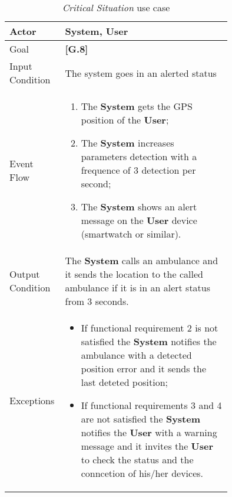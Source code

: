 \begin{center}
\begin{table}
\begin{tabular}{ | l | p{0.75\linewidth} | }
  \hline
    Actor & \textbf{System}, \textbf{User} \\ \hline
    Goal & \textbf{[G.8]} \\ \hline
    Input Condition & The system goes in an alerted status \\ \hline
    Event Flow & \begin{minipage}[t]{0.7\textwidth}
      \begin{enumerate}
        \item The \textbf{System} gets the GPS position of the \textbf{User};
        \item The \textbf{System} increases parameters detection with a frequence of 3 detection per second;
        \item The \textbf{System} shows an alert message on the \textbf{User} device (smartwatch or similar).
      \end{enumerate}
    \smallskip
  \end{minipage} \\ \hline
  Output Condition & The \textbf{System} calls an ambulance and it sends the location to the called ambulance if it is in an alert status from 3 seconds. \\ \hline
  Exceptions & \begin{minipage}[t]{0.7\textwidth}
    \begin{itemize}
      \smallskip
      \item If functional requirement 2 is not satisfied the \textbf{System} notifies the ambulance with a detected position error and it sends the last deteted position;
      \item If functional requirements 3 and 4 are not satisfied the \textbf{System} notifies the \textbf{User} with a warning message and it invites the \textbf{User} to check the status and the conncetion of his/her devices.
    \end{itemize}
    \smallskip
  \end{minipage}  \\ \hline
\end{tabular}
\caption{\textit{Critical Situation} use case}
\label{table:criticalSituation}
\end{table}
\end{center}
